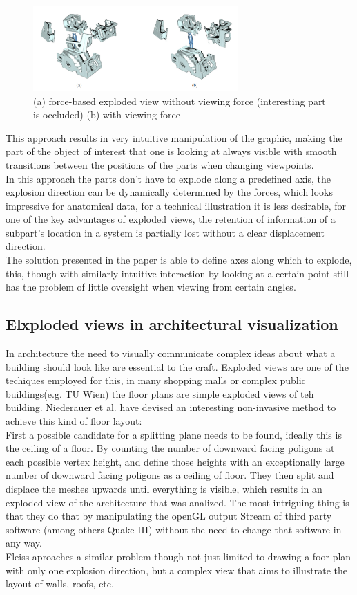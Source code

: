 \begin{figure}[tb]
	\centering
	\includegraphics[width=0.7\textwidth]{chapters/figures/motor}
	\caption{(a) force-based exploded view without viewing force (interesting part is occluded) (b) with viewing force\cite{proc:bruckner-2006-EVV}}
	\label{fig:motor}
\end{figure}
This approach results in very intuitive manipulation of the graphic, making the part of the object of interest that one is looking at always visible with smooth transitions between the positions of the parts when changing viewpoints.\\
In this approach the parts don't have to explode along a predefined axis, the explosion direction can be dynamically determined by the forces, which looks impressive for anatomical data, for a technical illustration it is less desirable, for one of the key advantages of exploded views, the retention of information of a subpart's location in a system is partially lost without a clear displacement direction.\\
The solution presented in the paper is able to define axes along which to explode, this, though with similarly intuitive interaction by looking at a certain point still has the problem of little oversight when viewing from certain angles.
\subsection{Elxploded views in architectural visualization}
In architecture the need to visually communicate complex ideas about what a building should look like are essential to the craft. Exploded views are one of the techiques employed for this, in many shopping malls or complex public buildings(e.g. TU Wien) the floor plans are simple exploded views of teh building. Niederauer et al. \cite{TODO} have devised an interesting non-invasive method to achieve this kind of floor layout:\\
First a possible candidate for a splitting plane needs to be found, ideally this is the ceiling of a floor.
By counting the number of downward facing poligons at each possible vertex height, and define those heights with an exceptionally large number of downward facing poligons as a ceiling of  floor. They then split and displace the meshes upwards until everything is visible, which results in an exploded view of the architecture that was analized. The most intriguing thing is that they do that by manipulating the openGL output Stream of third party software (among others Quake III) without the need to change that software in any way.\\
Fleiss \cite{TODO} aproaches a similar problem though not just limited to drawing a foor plan with only one explosion direction, but a complex view that aims to illustrate the layout of walls, roofs, etc.

